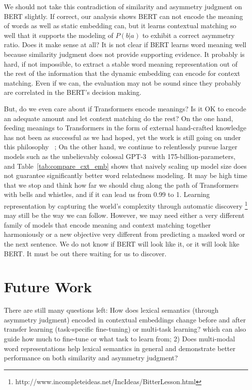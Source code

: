 \documentclass[letterpaper]{article} %
\begin{document}
We should not take this contradiction of similarity and asymmetry judgment on BERT slightly. If correct, our analysis shows BERT can not encode the meaning of words as well as static embedding can, but it learns contextual matching so well that it supports the modeling of $P(b|a)$ to exhibit a correct asymmetry ratio. Does it make sense at all? It is not clear if BERT learns word meaning well because similarity judgment does not provide supporting evidence. It probably is hard, if not impossible, to extract a stable word meaning representation out of the rest of the information that the dynamic embedding can encode for context matching. Even if we can, the evaluation may not be sound since they probably are correlated in the BERT's decision making. 

But, do we even care about if Transformers encode meanings? Is it OK to encode an adequate amount and let context matching do the rest? On the one hand, feeding meanings to Transformers in the form of external hand-crafted knowledge has not been as successful as we had hoped, yet the work is still going on under this philosophy ~\citep{liu2019k}; On the other hand, we continue to relentlessly pursue larger models such as the unbelievably colossal GPT-3~\cite{brown2020language} with 175-billion-parameters, and Table~\ref{tab:compare_cxt_emb} shows that naively scaling up model size does not guarantee significantly better word relatedness modeling. It may be high time that we stop and think how far we should chug along the path of Transformers with bells and whistles, and if it can lead us from 0.99 to 1. Learning representation by capturing the world's complexity through automatic discovery \footnote{http://www.incompleteideas.net/IncIdeas/BitterLesson.html} may still be the way we can follow. However, we may need either a very different family of models that encode meaning and context matching together harmoniously or a new objective very different from predicting a masked word or the next sentence. We do not know if BERT will look like it, or it will look like BERT. It must be out there waiting for us to discover.

\section{Future Work} There are still many questions left: How does lexical semantics (through asymmetry judgment) encoded in contextual embeddings change before and after transfer learning (task-specific fine-tuning) or multi-task learning? which can also guide how much to fine-tune or what task to learn from; 
2) Does multi-modal word representations help lexical semantics in general and demonstrate better  performance on both similarity and asymmetry judgment?
\end{document}
